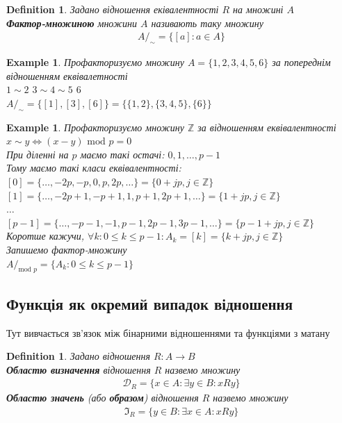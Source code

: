 \documentclass[a4paper, 14pt]{extarticle}
\theoremstyle{theoremdd}
\theoremstyle{theoremdd}
\newtheorem{definition}[theorem]{Definition}
\theoremstyle{theoremdd}
\theoremstyle{theoremdd}
\newtheorem{example}[theorem]{Example}
\theoremstyle{theoremdd}
\theoremstyle{theoremdd}
\theoremstyle{theoremdd}
\theoremstyle{theoremdd}
\begin{document}
\begin{definition}
Задано відношення еківалентності $R$ на множині $A$ \\
\textbf{Фактор-множиною} множини $A$ називають таку множину
\begin{align*}
A/_{\sim} = \{[a]: a \in A\}
\end{align*}
\end{definition}

\begin{example}
Профакторизуємо множину $A = \{1,2,3,4,5,6\}$ за попереднім відношенням еквівалетності\\
$1 \sim 2$ \hspace{0.5cm} $3 \sim 4 \sim 5$ \hspace{0.5cm} $6$\\
$A/_{\sim} = \{[1],[3],[6]\} = \{\{1,2\}, \{3,4,5\}, \{6 \} \}$
\end{example}

\begin{example}
Профакторизуємо множину $\mathbb{Z}$ за відношенням еквівалентності\\
$x \sim y \iff (x-y) \text{ mod } p = 0$\\
При діленні на $p$ маємо такі остачі: $0,1,\dots,p-1$\\
Тому маємо такі класи еквівалентності:\\
$[0] = \{\dots, -2p, -p, 0, p, 2p, \dots\} = \{0 + jp, j \in \mathbb{Z}\}$\\
$[1] = \{\dots, -2p+1, -p+1, 1, p+1, 2p+1, \dots\} = \{1 + jp, j \in \mathbb{Z}\}$\\
$\dots$\\
$[p-1] = \{\dots, -p-1, -1, p-1, 2p-1, 3p-1, \dots\} = \{p-1 + jp, j \in \mathbb{Z}\}$\\
Коротше кажучи, $\forall k: 0 \leq k \leq p-1: A_k = [k] = \{k+jp, j \in \mathbb{Z}\}$\\
Запишемо фактор-множину\\
$A/_{\text{mod } p} = \{A_k: 0 \leq k \leq p-1\}$
\end{example}

\subsection{Функція як окремий випадок відношення}
Тут вивчається зв'язок між бінарними відношеннями та функціями з матану
\begin{definition} 
Задано відношення $R: A \to B$\\
\textbf{Областю визначення} відношення $R$ назвемо множину
\begin{align*}
\mathcal{D}_R = \{x \in A: \exists y \in B: xRy\}
\end{align*}
\textbf{Областю значень} (або \textbf{образом}) відношення $R$ назвемо множину
\begin{align*}
\Im_R = \{y \in B: \exists x \in A: xRy\}
\end{align*}
\end{definition}
\end{document}

